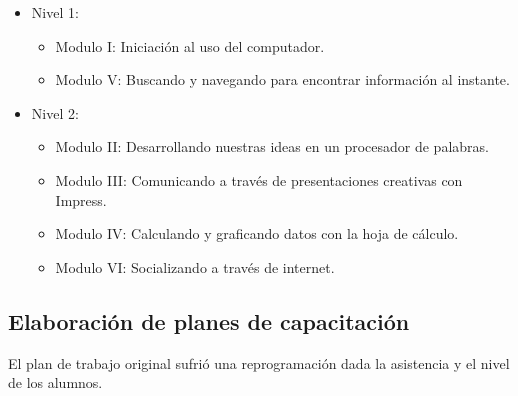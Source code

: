                 \begin{itemize}
                    \item Nivel 1:
                    \begin{itemize}
                        \item Modulo I: Iniciación al uso del computador.
                        \item Modulo V: Buscando y navegando para encontrar información al instante.
                    \end{itemize}
                    \item Nivel 2:
                    \begin{itemize}
                        \item Modulo II: Desarrollando nuestras ideas en un procesador de palabras.
                        \item Modulo III: Comunicando a través de presentaciones creativas con Impress.
                        \item Modulo IV: Calculando y graficando datos con la hoja de cálculo.
                        \item Modulo VI: Socializando a través de internet.
                    \end{itemize}
                \end{itemize}
                
            \subsection {Elaboración de planes de capacitación}
            
            El plan de trabajo original sufrió una reprogramación dada la asistencia y el nivel de los alumnos.
            
